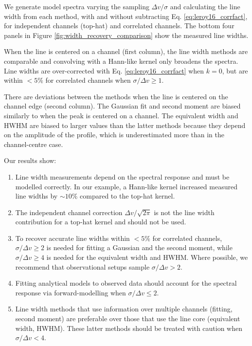 \documentclass{rnaastex}
\begin{document}
We generate model spectra varying the sampling $\Delta v / \sigma$ and calculating the line width from each method, with and without subtracting Eq. \ref{eq:leroy16_corrfact}, for independent channels (top-hat) and correlated channels. The bottom four panels in Figure \ref{fig:width_recovery_comparison} show the measured line widths.

When the line is centered on a channel (first column), the line width methods are comparable and convolving with a Hann-like kernel only broadens the spectra.  Line widths are over-corrected with Eq. \ref{eq:leroy16_corrfact} when $k=0$, but are within $<5\%$ for correlated channels when $\sigma/\Delta v \geq 1$.

There are deviations between the methods when the line is centered on the channel edge (second column). The Gaussian fit and second moment are biased similarly to when the peak is centered on a channel.  The equivalent width and HWHM are biased to larger values than the latter methods because they depend on the amplitude of the profile, which is underestimated more than in the channel-centre case.

Our results show:
\begin{enumerate}
    \item Line width measurements depend on the spectral response and must be modelled correctly. In our example, a Hann-like kernel increased measured line widths by $\sim10\%$ compared to the top-hat kernel.
    \item The independent channel correction $\Delta v / \sqrt{2\pi}$ is not the line width contribution for a top-hat kernel and should not be used.
    \item To recover accurate line widths within $<5\%$ for correlated channels, $\sigma / \Delta v \geq 2$ is needed for fitting a Gaussian and the second moment, while $\sigma / \Delta v \geq 4$ is needed for the equivalent width and HWHM.
    Where possible, we recommend that observational setups sample $\sigma / \Delta v > 2$.
    \item Fitting analytical models to observed data should account for the spectral response via forward-modelling when $\sigma / \Delta v \leq 2$.
    \item Line width methods that use information over multiple channels (fitting, second moment) are preferable over those that use the line core (equivalent width, HWHM). These latter methods should be treated with caution when $\sigma / \Delta v <4$.
\end{enumerate}
\end{document}
